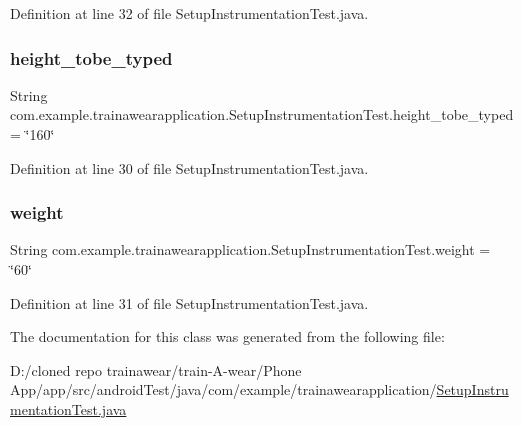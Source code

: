 Definition at line 32 of file Setup\+Instrumentation\+Test.\+java.

\mbox{\label{classcom_1_1example_1_1trainawearapplication_1_1_setup_instrumentation_test_a969cc5898cf6bdc58207c1944f573a78}} 
\subsubsection{\texorpdfstring{height\_tobe\_typed}{height\_tobe\_typed}}
{\footnotesize\ttfamily String com.\+example.\+trainawearapplication.\+Setup\+Instrumentation\+Test.\+height\+\_\+tobe\+\_\+typed = \char`\"{}160\char`\"{}\hspace{0.3cm}{\ttfamily [private]}}



Definition at line 30 of file Setup\+Instrumentation\+Test.\+java.

\mbox{\label{classcom_1_1example_1_1trainawearapplication_1_1_setup_instrumentation_test_a09706ee1f2c90e4a5ea3edb460714adb}} 
\subsubsection{\texorpdfstring{weight}{weight}}
{\footnotesize\ttfamily String com.\+example.\+trainawearapplication.\+Setup\+Instrumentation\+Test.\+weight = \char`\"{}60\char`\"{}\hspace{0.3cm}{\ttfamily [private]}}



Definition at line 31 of file Setup\+Instrumentation\+Test.\+java.



The documentation for this class was generated from the following file\+:\begin{DoxyCompactItemize}
\item 
D\+:/cloned repo trainawear/train-\/\+A-\/wear/\+Phone App/app/src/android\+Test/java/com/example/trainawearapplication/\mbox{\hyperlink{_setup_instrumentation_test_8java}{Setup\+Instrumentation\+Test.\+java}}\end{DoxyCompactItemize}
